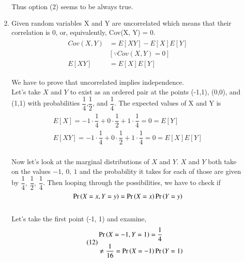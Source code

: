 \documentclass[journal,12pt,twocolumn]{IEEEtran}
\begin{document}
\begin{enumerate}
\begin{align}
\begin{split}
    \end{split}
\end{align}\\
Thus option (2) seems to be always true.\\
    \item Given random variables X and Y are uncorrelated which means that their correlation is 0, or, equivalently, Cov(X, Y) = 0.\\
\begin{align}\tag{11}
    \begin{split}
        Cov(X, Y) &= E[XY] - E[X]E[Y]\\
        &[\because Cov(X, Y) = 0]\\
        E[XY] &= E[X]E[Y]
    \end{split}
\end{align}

We have to prove that uncorrelated implies independence.\\
Let’s take $X$ and $Y$ to exist as an ordered pair at the points (-1,1), (0,0), and (1,1) with probabilities $\dfrac{1}{4}$,$\dfrac{1}{2}$, and $\dfrac{1}{4}$. The expected values of X and Y is\\
\begin{align}\tag{11}
    \begin{split}
        E[X] = -1\cdot\dfrac{1}{4} + 0\cdot\dfrac{1}{2} + 1\cdot\dfrac{1}{4} = 0 = E[Y]\\
        E[XY] = -1\cdot\dfrac{1}{4} + 0\cdot\dfrac{1}{2} + 1\cdot\dfrac{1}{4} = 0 = E[X]E[Y]
    \end{split}
\end{align}\\

Now let's look at the marginal distributions of $X$ and $Y$. $X$ and $Y$ both take on the values $-1,\ 0,\ 1$ and the probability it takes for each of those are given by $\dfrac{1}{4},\ \dfrac{1}{2},\ \dfrac{1}{4}$. Then looping through the possibilities, we have to check if $$\Pr\left(X=x, Y=y\right) = \Pr\left(X=x\right)\Pr\left(Y=y\right)$$\\
Let's take the first point (-1, 1) and examine,\\
\begin{align}\tag{12}
    \begin{split}
        &\Pr\left(X=-1, Y=1\right) = \dfrac{1}{4}\\ &\ne \dfrac{1}{16} = \Pr\left(X=-1\right)\Pr\left(Y=1\right)
    \end{split}
\end{align}


\end{enumerate}
\end{document}
